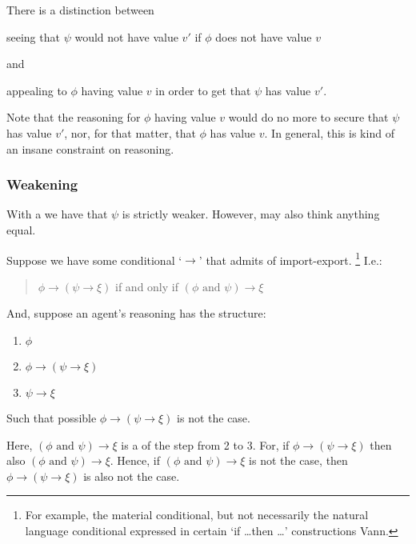 \begin{note}
  There is a distinction between

  seeing that \(\psi\) would not have value \(v'\) if \(\phi\) does not have value \(v\)

  and

  appealing to \(\phi\) having value \(v\) in order to get that \(\psi\) has value \(v'\).


  Note that the reasoning for \(\phi\) having value \(v\) would do no more to secure that \(\psi\) has value \(v'\), nor, for that matter, that \(\phi\) has value \(v\).
  In general, this is kind of an insane constraint on reasoning.
\end{note}

\subsubsection{Weakening}
\label{sec:weakening}

\begin{note}
  With a \requ{} we have that \(\psi\) is strictly weaker.
  However, may also think anything equal.
\end{note}

\begin{note}
  \begin{illustration}
    \label{illu:requ:import-export}
    Suppose we have some conditional `\(\rightarrow\)' that admits of import-export.\nolinebreak
    \footnote{
      For example, the material conditional, but not necessarily the natural language conditional expressed in certain `if \dots then \dots' constructions {\color{red} Vann}.
    }
    I.e.:
    \begin{quote}
      \(\phi \rightarrow (\psi \rightarrow \xi)\) if and only if \((\phi \text{ and } \psi) \rightarrow \xi\)
    \end{quote}
    And, suppose an agent's reasoning has the structure:
    \begin{enumerate}
    \item \(\phi\)
    \item \(\phi \rightarrow (\psi \rightarrow \xi)\)
    \item \(\psi \rightarrow \xi\)
    \end{enumerate}
    Such that possible \(\phi \rightarrow (\psi \rightarrow \xi)\) is not the case.
  \end{illustration}

  Here, \((\phi \text{ and } \psi) \rightarrow \xi\) is a \prequ{} of the step from 2 to 3.
  For, if \(\phi \rightarrow (\psi \rightarrow \xi)\) then also \((\phi \text{ and } \psi) \rightarrow \xi\).
  Hence, if \((\phi \text{ and } \psi) \rightarrow \xi\) is not the case, then \(\phi \rightarrow (\psi \rightarrow \xi)\) is also not the case.
\end{note}

